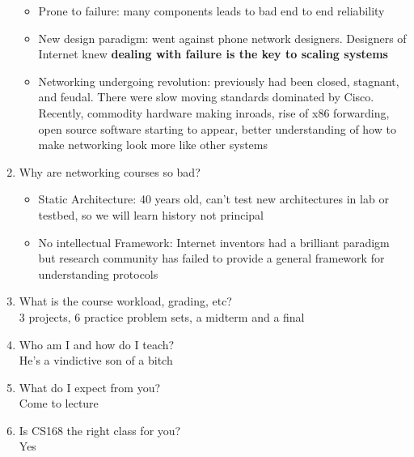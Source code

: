 \documentclass{article}
\begin{document}
\begin{enumerate}
\begin{itemize}
\item Prone to failure: many components leads to bad end to end reliability
\item New design paradigm: went against phone network designers. Designers of Internet knew \textbf{dealing with failure is the key to scaling systems}
\item Networking undergoing revolution: previously had been closed, stagnant, and feudal. There were slow moving standards dominated by Cisco. Recently, commodity hardware making inroads, rise of x86 forwarding, open source software starting to appear, better understanding of how to make networking look more like other systems
\end{itemize}
\item Why are networking courses so bad?
\begin{itemize}
\item Static Architecture: 40 years old, can't test new architectures in lab or testbed, so we will learn history not principal
\item No intellectual Framework: Internet inventors had a brilliant paradigm but research community has failed to provide a general framework for understanding protocols
\end{itemize}
\item What is the course workload, grading, etc? \\
3 projects, 6 practice problem sets, a midterm and a final
\item Who am I and how do I teach? \\ 
He's a vindictive son of a bitch
\item What do I expect from you? \\
Come to lecture
\item Is CS168 the right class for you? \\
Yes
\end{enumerate}
\end{document}
